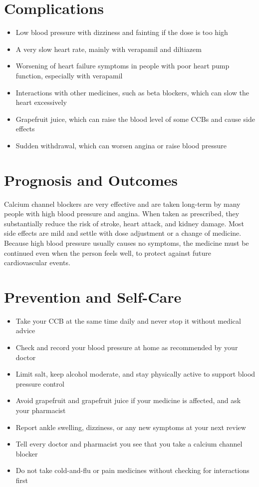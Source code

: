 \section*{Complications}
\begin{itemize}
    \item Low blood pressure with dizziness and fainting if the dose is too high
    \item A very slow heart rate, mainly with verapamil and diltiazem
    \item Worsening of heart failure symptoms in people with poor heart pump function, especially with verapamil
    \item Interactions with other medicines, such as beta blockers, which can slow the heart excessively
    \item Grapefruit juice, which can raise the blood level of some CCBs and cause side effects
    \item Sudden withdrawal, which can worsen angina or raise blood pressure
\end{itemize}

\section*{Prognosis and Outcomes}
Calcium channel blockers are very effective and are taken long-term by many people with high blood pressure and angina. When taken as prescribed, they substantially reduce the risk of stroke, heart attack, and kidney damage. Most side effects are mild and settle with dose adjustment or a change of medicine. Because high blood pressure usually causes no symptoms, the medicine must be continued even when the person feels well, to protect against future cardiovascular events.

\section*{Prevention and Self-Care}
\begin{itemize}
    \item Take your CCB at the same time daily and never stop it without medical advice
    \item Check and record your blood pressure at home as recommended by your doctor
    \item Limit salt, keep alcohol moderate, and stay physically active to support blood pressure control
    \item Avoid grapefruit and grapefruit juice if your medicine is affected, and ask your pharmacist
    \item Report ankle swelling, dizziness, or any new symptoms at your next review
    \item Tell every doctor and pharmacist you see that you take a calcium channel blocker
    \item Do not take cold-and-flu or pain medicines without checking for interactions first
\end{itemize}

